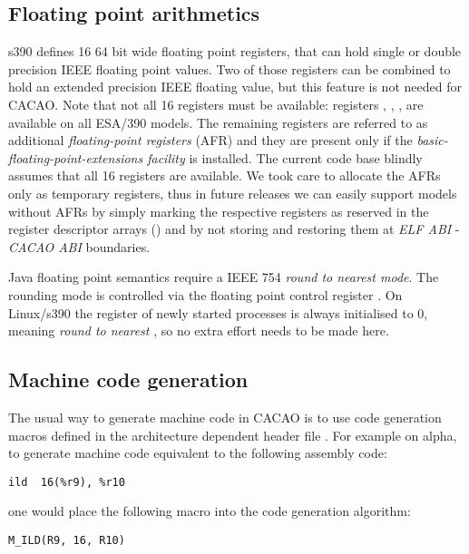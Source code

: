 \subsection{Floating point arithmetics}

s390 defines 16 64 bit wide floating point registers, that can hold single or double precision IEEE floating point values. Two of those registers can be combined to hold an extended precision IEEE floating value, but this feature is not needed for CACAO. Note that not all 16 registers must be available: registers , , ,  are available on all ESA/390 models. The remaining registers are referred to as additional \emph{floating-point registers} (AFR) and they are present only if the \emph{basic-floating-point-extensions facility} is installed. The current code base blindly assumes that all 16 registers are available. We took care to allocate the AFRs only as temporary registers, thus in future releases we can easily support models without AFRs by simply marking the respective registers as reserved in the register descriptor arrays () and by not storing and restoring them at \emph{ELF ABI} - \emph{CACAO ABI} boundaries.

Java floating point semantics require a IEEE 754 \emph{round to nearest mode}. The rounding mode is controlled via the floating point control register . On Linux/s390 the  register of newly started processes is always initialised to 0, meaning \emph{round to nearest} \cite{s390:bib:abi}, so no extra effort needs to be made here.

\subsection{Machine code generation}

The usual way to generate machine code in CACAO is to use code generation macros defined in the architecture dependent header file . For example on alpha, to generate machine code equivalent to the following assembly code:

\begin{verbatim}
ild  16(%r9), %r10
\end{verbatim}

one would place the following macro into the code generation algorithm:

\begin{verbatim}
M_ILD(R9, 16, R10)
\end{verbatim}

